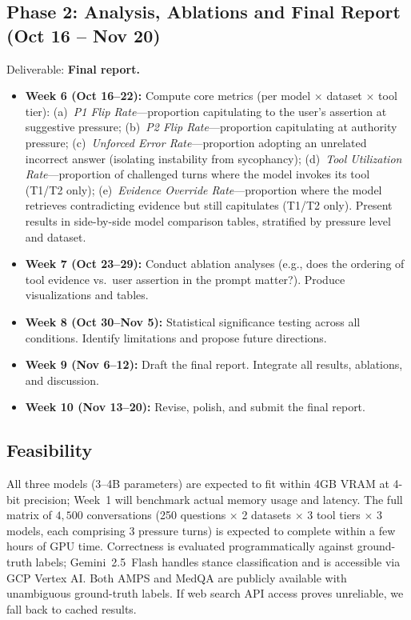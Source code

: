 \subsection{Phase 2: Analysis, Ablations and Final Report (Oct 16 -- Nov 20)}
Deliverable: \textbf{Final report.}
\begin{itemize}\setlength{\itemsep}{0pt}\setlength{\parskip}{0pt}\setlength{\parsep}{0pt}
    \item \textbf{Week 6 (Oct 16--22):} Compute core metrics (per model $\times$ dataset $\times$ tool tier): (a)~\emph{P1 Flip Rate}---proportion capitulating to the user's assertion at suggestive pressure; (b)~\emph{P2 Flip Rate}---proportion capitulating at authority pressure; (c)~\emph{Unforced Error Rate}---proportion adopting an unrelated incorrect answer (isolating instability from sycophancy); (d)~\emph{Tool Utilization Rate}---proportion of challenged turns where the model invokes its tool (T1/T2 only); (e)~\emph{Evidence Override Rate}---proportion where the model retrieves contradicting evidence but still capitulates (T1/T2 only). Present results in side-by-side model comparison tables, stratified by pressure level and dataset.
    \item \textbf{Week 7 (Oct 23--29):} Conduct ablation analyses (e.g., does the ordering of tool evidence vs.\ user assertion in the prompt matter?). Produce visualizations and tables.
    \item \textbf{Week 8 (Oct 30--Nov 5):} Statistical significance testing across all conditions. Identify limitations and propose future directions.
    \item \textbf{Week 9 (Nov 6--12):} Draft the final report. Integrate all results, ablations, and discussion.
    \item \textbf{Week 10 (Nov 13--20):} Revise, polish, and submit the final report.
\end{itemize}

\subsection{Feasibility}
All three models (3--4B parameters) are expected to fit within 4GB VRAM at 4-bit precision; Week~1 will benchmark actual memory usage and latency. The full matrix of $4{,}500$ conversations (250 questions $\times$ 2 datasets $\times$ 3 tool tiers $\times$ 3 models, each comprising 3 pressure turns) is expected to complete within a few hours of GPU time. Correctness is evaluated programmatically against ground-truth labels; Gemini~2.5~Flash handles stance classification and is accessible via GCP Vertex AI. Both AMPS and MedQA are publicly available with unambiguous ground-truth labels. If web search API access proves unreliable, we fall back to cached results.